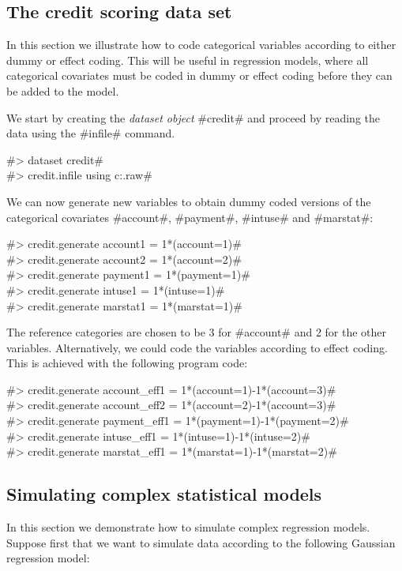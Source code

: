 \subsection{The credit scoring data set}

In this section we illustrate how to code categorical variables
according to either dummy or effect coding. This will be useful in
regression models, where all categorical covariates must be coded
in dummy or effect coding before they can be added to the model.

We start by creating the {\em dataset object} #credit# and proceed
by reading the data using the #infile# command.

#> dataset credit# \\
#> credit.infile using c:\bayesx\examples\credit.raw#

We can now generate new variables to obtain dummy coded versions
of the categorical covariates
#account#, #payment#, #intuse# and #marstat#:

#> credit.generate account1  = 1*(account=1)# \\
#> credit.generate account2  = 1*(account=2)# \\
#> credit.generate payment1 = 1*(payment=1)# \\
#> credit.generate intuse1 = 1*(intuse=1)# \\
#> credit.generate marstat1 = 1*(marstat=1)#

The reference categories are chosen to be 3 for #account# and 2
for the other variables. Alternatively, we could code the
variables according to effect coding. This is achieved with the
following program code:

#> credit.generate account_eff1  = 1*(account=1)-1*(account=3)# \\
#> credit.generate account_eff2  = 1*(account=2)-1*(account=3)# \\
#> credit.generate payment_eff1 = 1*(payment=1)-1*(payment=2)# \\
#> credit.generate intuse_eff1 = 1*(intuse=1)-1*(intuse=2)# \\
#> credit.generate marstat_eff1 = 1*(marstat=1)-1*(marstat=2)#


\subsection{Simulating complex statistical models}
 

In this section we demonstrate how to simulate complex regression
models. Suppose first that we want to simulate data according to
the following Gaussian regression model:

